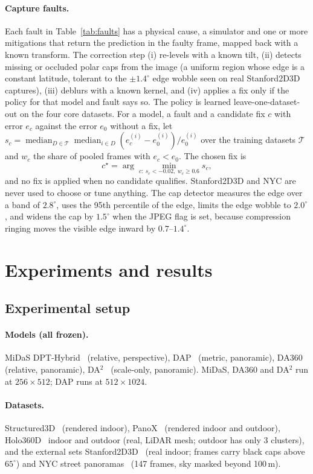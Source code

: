 \documentclass{article}
\begin{document}
\paragraph{Capture faults.} Each fault in Table~\ref{tab:faults} has a physical cause, a simulator and one or more mitigations that return the prediction in the faulty frame, mapped back with a known transform. The correction step (i) re-levels with a known tilt, (ii) detects missing or occluded polar caps from the image (a uniform region whose edge is a constant latitude, tolerant to the $\pm1.4^\circ$ edge wobble seen on real Stanford2D3D captures), (iii) deblurs with a known kernel, and (iv) applies a fix only if the policy for that model and fault says so. The policy is learned leave-one-dataset-out on the four core datasets. For a model, a fault and a candidate fix $c$ with error $e_c$ against the error $e_0$ without a fix, let $s_c=\operatorname{median}_{D\in\mathcal T}\operatorname{median}_{i\in D}(e_c^{(i)}-e_0^{(i)})/e_0^{(i)}$ over the training datasets $\mathcal T$ and $w_c$ the share of pooled frames with $e_c<e_0$. The chosen fix is
\begin{equation}
c^\star=\arg\min_{c:\ s_c<-0.02,\ w_c\ge0.6}s_c,
\end{equation}
and no fix is applied when no candidate qualifies. Stanford2D3D and NYC are never used to choose or tune anything. The cap detector measures the edge over a band of $2.8^\circ$, uses the 95th percentile of the edge, limits the edge wobble to $2.0^\circ$, and widens the cap by $1.5^\circ$ when the JPEG flag is set, because compression ringing moves the visible edge inward by $0.7$--$1.4^\circ$.

\section{Experiments and results}
\subsection{Experimental setup}
\paragraph{Models (all frozen).} MiDaS DPT-Hybrid~\cite{ranftl2021dpt} (relative, perspective), DAP~\cite{lin2025dap} (metric, panoramic), DA360~\cite{jiang2025da360} (relative, panoramic), DA$^2$~\cite{li2026da2} (scale-only, panoramic). MiDaS, DA360 and DA$^2$ run at $256\times512$; DAP runs at $512\times1024$.
\paragraph{Datasets.} Structured3D~\cite{zheng2020structured3d} (rendered indoor), PanoX~\cite{huang2025omnix} (rendered indoor and outdoor), Holo360D~\cite{ou2026holo360d} indoor and outdoor (real, LiDAR mesh; outdoor has only 3 clusters), and the external sets Stanford2D3D~\cite{armeni2017joint} (real indoor; frames carry black caps above $65^\circ$) and NYC street panoramas~\cite{lin2025dap} (147 frames, sky masked beyond 100\,m).
\end{document}
